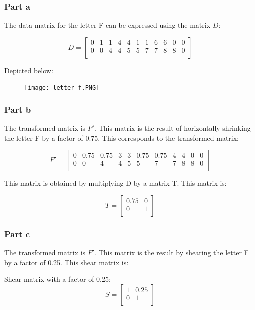 \documentclass{article}
\begin{document}
\subsubsection*{Part a}

The data matrix for the letter F can be expressed using the matrix $D$:

\[
  D =
  \left[ {\begin{array}{ccccccccccc}
    0 & 1 & 1 & 4 & 4 & 1 & 1 & 6 & 6 & 0 & 0\\
    0 & 0 & 4 & 4 & 5 & 5 & 7 & 7 & 8 & 8 & 0\\
  \end{array} } \right]
\]

Depicted below:
\begin{figure}[H]
  \centering
  \texttt{[image: letter\_f.PNG]}
  \label{fig3}
\end{figure}


\subsubsection*{Part b}

The transformed matrix is $F'$. This matrix is the result of horizontally shrinking the letter F by a factor of 0.75. This corresponds to the transformed matrix:

\[
  F' =
  \left[ {\begin{array}{ccccccccccc}
    0 & 0.75 & 0.75 & 3 & 3 & 0.75 & 0.75 & 4 & 4 & 0 & 0\\
    0 & 0 & 4 & 4 & 5 & 5 & 7 & 7 & 8 & 8 & 0\\
  \end{array} } \right]
\]

This matrix is obtained by multiplying D by a matrix T. This matrix is:

\[T = 
\begin{bmatrix}
    0.75 & 0 \\
    0 & 1\\
\end{bmatrix}
\]

\subsubsection*{Part c}

The transformed matrix is $F'$. This matrix is the result by shearing the letter F by a factor of 0.25. This shear matrix is:

Shear matrix with a factor of 0.25:
\[
  S =
  \left[ {\begin{array}{cc}
    1 & 0.25 \\
    0 & 1 \\
  \end{array} } \right]
\]
\end{document}
